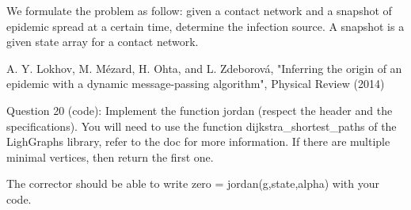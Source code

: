 \documentclass[11pt]{article}
\begin{document}
We formulate the problem as follow: given a contact network and a
snapshot of epidemic spread at a certain time, determine the infection
source. A snapshot is a given state array for a contact network.

A. Y. Lokhov, M. Mézard, H. Ohta, and L. Zdeborová, "Inferring the
origin of an epidemic with a dynamic message-passing algorithm",
Physical Review (2014)

    Question 20 (code): Implement the function jordan (respect the header
and the specifications). You will need to use the function
dijkstra\_shortest\_paths of the LighGraphs library, refer to the doc
for more information. If there are multiple minimal vertices, then
return the first one.

{The corrector should be able to write zero = jordan(g,state,alpha) with
your code.}
\end{document}

